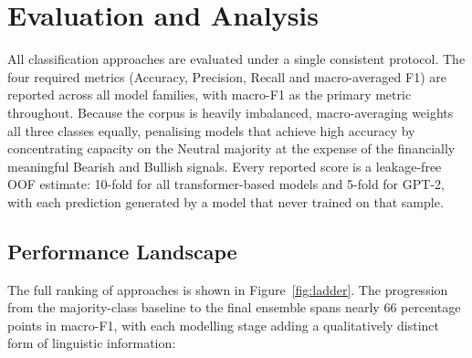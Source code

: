 \documentclass[11pt,a4paper]{article}
\begin{document}
\section{Evaluation and Analysis}
\label{sec:results}
All classification approaches are evaluated under a single consistent protocol. The four required metrics (Accuracy, Precision, Recall and macro-averaged F1) are reported across all model families, with macro-F1 as the primary metric throughout. Because the corpus is heavily imbalanced, macro-averaging weights all three classes equally, penalising models that achieve high accuracy by concentrating capacity on the Neutral majority at the expense of the financially meaningful Bearish and Bullish signals. Every reported score is a leakage-free OOF estimate: 10-fold for all transformer-based models and 5-fold for GPT-2, with each prediction generated by a model that never trained on that sample.


\subsection{Performance Landscape}

The full ranking of approaches is shown in Figure~\ref{fig:ladder}. The progression from the majority-class baseline to the final ensemble spans nearly 66 percentage points in macro-F1, with each modelling stage adding a qualitatively distinct form of linguistic information:
\end{document}
